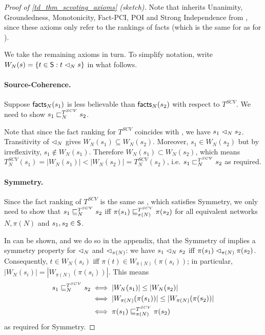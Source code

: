 \begin{proof}[Proof of \cref{td_thm_scvoting_axioms} (sketch)]

Note that \scvoting{} inherits Unanimity, Groundedness, Monotonicity, Fact-PCI,
POI and Strong Independence from \voting{}, since these axioms only refer to
the rankings of facts (which is the same for \scvoting{} as for \voting{}).

We take the remaining axioms in turn. To simplify notation, write $W_N(s) = \{t
\in \S : t \scoh_N s \}$ in what follows.

\paragraph{Source-Coherence.}

Suppose $\facts_N(s_1)$ is less believable than $\facts_N(s_2)$ with respect to
$T^{SCV}$. We need to show $s_1 \slt_N^{T^{SCV}} s_2$.

Note that since the fact ranking for $T^{SCV}$ coincides with \voting{}, we
have $s_1 \scoh_N s_2$. Transitivity of ${\scoh_N}$ gives $W_N(s_1) \subseteq
W_N(s_2)$. Moreover, $s_1 \in W_N(s_2)$ but by irreflexivity, $s_1 \notin
W_N(s_1)$. Therefore $W_N(s_1) \subset W_N(s_2)$, which means $T_N^{SCV}(s_1) =
|W_N(s_1)| < |W_N(s_2)| = T_N^{SCV}(s_2)$, i.e.  $s_1 \slt_N^{T^{SCV}} s_2$ as
required.

\paragraph{Symmetry.} Since the fact ranking of $T^{SCV}$ is the same as
\voting{}, which satisfies Symmetry, we only need to show that $s_1
\sle_N^{T^{SCV}} s_2$ iff $\pi(s_1) \sle_{\pi(N)}^{T^{SCV}} \pi(s_2)$ for all
equivalent networks $N, \pi(N)$ and $s_1, s_2 \in \S$.

In can be shown, and we do so in the appendix, that the Symmetry of \voting{}
implies a symmetry property for ${\scoh_N}$ and ${\scoh_{\pi(N)}}$: we have
$s_1 \scoh_N s_2$ iff $\pi(s_1) \scoh_{\pi(N)} \pi(s_2)$. Consequently, $t \in
W_N(s_i)$ iff $\pi(t) \in W_{\pi(N)}(\pi(s_i))$; in particular, $|W_N(s_i)| =
|W_{\pi(N)}(\pi(s_i))|$. This means
\begin{align*}
    s_1 \sle_N^{T^{SCV}} s_2
    & \iff |W_N(s_1)| \le |W_N(s_2)| \\
    & \iff |W_{\pi(N)}(\pi(s_1))| \le |W_{\pi(N)}(\pi(s_2))| \\
    & \iff \pi(s_1) \sle_{\pi(N)}^{T^{SCV}} \pi(s_2)
\end{align*}
as required for Symmetry.


\end{proof}
